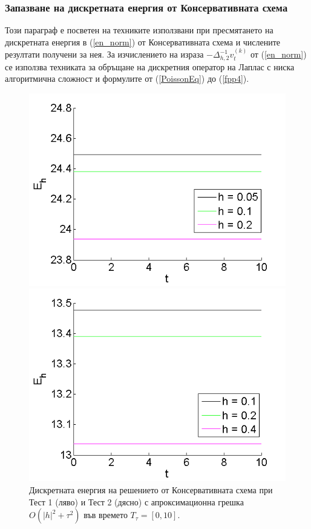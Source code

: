 \documentclass{article}
\newcommand{\rf}[1]{(\ref{#1})}
\theoremstyle{remark}
\begin{document}
\subsubsection{ Запазване на дискретната енергия от Консервативната схема }
Този параграф е посветен на техниките използвани при пресмятането на дискретната енергия в \rf{en_norm} от Консервативната схема и числените резултати получени за нея. За изчислението на израза $-\Delta_{h,2}^{-1}v_{t}^{(k)}$ от \rf{en_norm} се използва техниката за обръщане на дискретния оператор на Лаплас с ниска алгоритмична сложност и формулите от \rf{PoissonEq} до \rf{fpp4}.
\begin{figure}[ht]\vspace{0.02cm}
	\begin{minipage}[b]{0.48\linewidth}
		\includegraphics[width=\linewidth]{../amitans/figures/Energy_EnergySave_bt3_c045_x3O.png}	
	\end{minipage}
	\begin{minipage}[b]{0.48\linewidth}
		 \includegraphics[width=\linewidth]{../amitans/figures/Energy_EnergySave_bt1_c090_x3O.png}
	\end{minipage}
\caption{Дискретната енергия на решението от Консервативната схема при Тест 1 (ляво) и Тест 2 (дясно) с апроксимационна грешка $O(|h|^2 + \tau^2)$ във времето $T_{\tau} = [0, 10]$.}
\label{EnOnly}
\end{figure}
\end{document}
